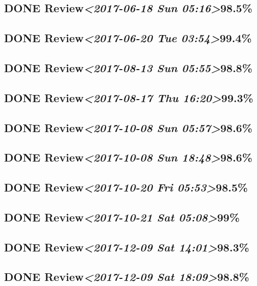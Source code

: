 \documentclass[11pt]{ctexart}
\begin{document}
\subsection{{\bfseries\sffamily DONE} Review\textit{<2017-06-18 Sun 05:16>}98.5\%}
\label{sec:org19ef185}
\subsection{{\bfseries\sffamily DONE} Review\textit{<2017-06-20 Tue 03:54>}99.4\%}
\label{sec:orgf17d0c1}
\subsection{{\bfseries\sffamily DONE} Review\textit{<2017-08-13 Sun 05:55>}98.8\%}
\label{sec:org5c1c969}
\subsection{{\bfseries\sffamily DONE} Review\textit{<2017-08-17 Thu 16:20>}99.3\%}
\label{sec:org06f8823}
\subsection{{\bfseries\sffamily DONE} Review\textit{<2017-10-08 Sun 05:57>}98.6\%}
\label{sec:org4d7ebf5}
\subsection{{\bfseries\sffamily DONE} Review\textit{<2017-10-08 Sun 18:48>}98.6\%}
\label{sec:orge1a95f3}
\subsection{{\bfseries\sffamily DONE} Review\textit{<2017-10-20 Fri 05:53>}98.5\%}
\label{sec:org76a5a75}
\subsection{{\bfseries\sffamily DONE} Review\textit{<2017-10-21 Sat 05:08>}99\%}
\label{sec:orgc49a7df}

\subsection{{\bfseries\sffamily DONE} Review\textit{<2017-12-09 Sat 14:01>}98.3\%}
\label{sec:org17c672d}
\subsection{{\bfseries\sffamily DONE} Review\textit{<2017-12-09 Sat 18:09>}98.8\%}
\label{sec:org6525892}
\end{document}
